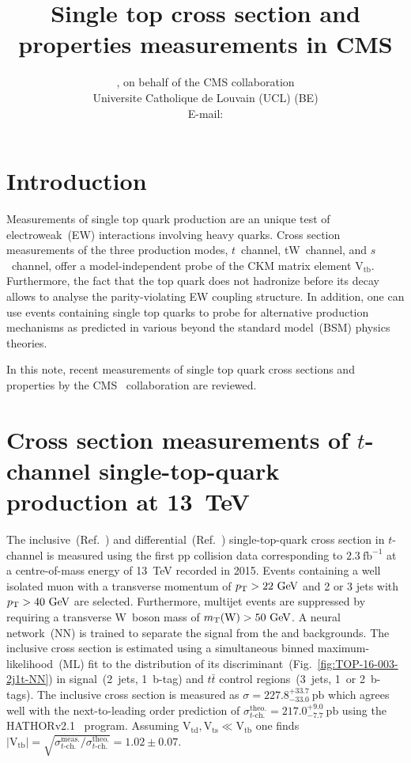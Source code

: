 \documentclass{PoS}
\title{Single top cross section and properties measurements in CMS}
\author{
    \speaker{Matthias Komm}, on behalf of the CMS collaboration\\
    Universite Catholique de Louvain (UCL) (BE)\\
    E-mail: \email{Matthias.Komm@cern.ch}
}
\begin{document}
\section{Introduction}
Measurements of single top quark production are an unique test of electroweak~(EW) interactions involving heavy quarks. Cross section measurements of the three production modes, $t$~channel, tW~channel, and $s$~channel, offer a model-independent probe of the CKM matrix element $\mathrm{V}_\mathrm{tb}$. Furthermore, the fact that the top quark does not hadronize before its decay allows to analyse the parity-violating EW coupling structure. In addition, one can use events containing single top quarks to probe for alternative production mechanisms as predicted in various beyond the standard model~(BSM) physics theories.

In this note, recent measurements of single top quark cross sections and properties by the CMS~\cite{detector} collaboration are reviewed.


\section{Cross section measurements of $t$-channel single-top-quark production at 13~TeV}

The inclusive~(Ref.~\cite{CMS-PAS-TOP-16-003}) and differential~(Ref.~\cite{CMS-PAS-TOP-16-004}) single-top-quark cross section in $t$-channel is measured using the first pp collision data corresponding to $2.3~\mathrm{fb^{-1}}$ at a centre-of-mass energy of 13~TeV recorded in 2015. Events containing a well isolated muon with a transverse momentum of $p_\mathrm{T}>22~\mathrm{GeV}$ and 2 or 3 jets with $p_\mathrm{T}>40~\mathrm{GeV}$ are selected. Furthermore, multijet events are suppressed by requiring a transverse W~boson mass of $m_{\mathrm{T}}(\mathrm{W})>50~\mathrm{GeV}$. A neural network~(NN) is trained to separate the signal from the \wjets and \ttbar backgrounds. The inclusive cross section is estimated using a simultaneous binned maximum-likelihood~(ML) fit to the distribution of its discriminant~(Fig.~\ref{fig:TOP-16-003-2j1t-NN}) in signal~(2~jets, 1~b-tag) and $t\bar{t}$ control regions~(3~jets, 1~or 2~b-tags). The inclusive cross section is measured as $\sigma=227.8^{+33.7}_{-33.0}~\mathrm{pb}$ which agrees well with the next-to-leading order prediction of $\sigma_{t\mbox{-}\mathrm{ch.}}^\mathrm{theo.}=217.0^{+9.0}_{-7.7}~\mathrm{pb}$ using the \textsc{HATHOR}v2.1~\cite{hathor} program. Assuming $\mathrm{V}_\mathrm{td},\mathrm{V}_\mathrm{ts}\ll\mathrm{V}_\mathrm{tb} $ one finds $|\mathrm{V}_\mathrm{tb}|=\sqrt{\sigma_{t\mbox{-}\mathrm{ch.}}^\mathrm{meas.}/\sigma_{t\mbox{-}\mathrm{ch.}}^\mathrm{theo.}}=1.02\pm0.07$.
\end{document}
